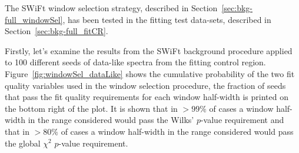 The SWiFt window selection strategy, described in Section~\ref{sec:bkg-full_windowSel}, has been tested in the fitting test data-sets, described in Section~\ref{sec:bkg-full_fitCR}.


Firstly, let's examine the results from the SWiFt background procedure applied to 100 different seeds of data-like spectra from the fitting control region.
Figure~\ref{fig:windowSel_dataLike} shows the cumulative probability of the two fit quality variables used in the window selection procedure,
the fraction of seeds that pass the fit quality requirements for each window half-width is printed on the bottom right of the plot.
It is shown that in $>99\%$ of cases a window half-width in the range considered would pass the Wilks' \mbox{$p$-value} requirement
and that in $>80\%$ of cases a window half-width in the range considered would pass the global $\chi^{2}$ \mbox{$p$-value} requirement.

